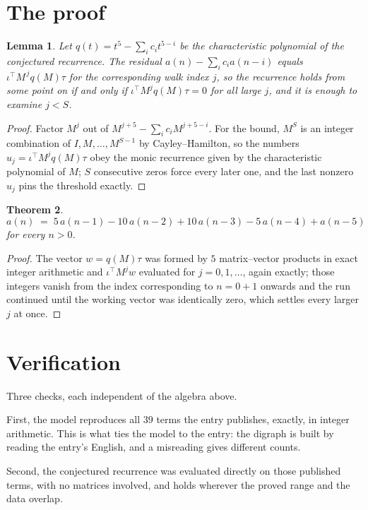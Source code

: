\documentclass[11pt,a4paper]{article}
\theoremstyle{plain}
\newtheorem{theorem}{Theorem}
\newtheorem{lemma}[theorem]{Lemma}
\theoremstyle{definition}
\begin{document}
\section{The proof}

\begin{lemma}\label{lem:crit}
Let $q(t)=t^{5}-\sum_i c_it^{5-i}$ be the characteristic polynomial of the
conjectured recurrence. The residual $a(n)-\sum_ic_ia(n-i)$ equals
$\iota^{\!\top}M^{\,j}q(M)\tau$ for the corresponding walk index $j$, so the recurrence
holds from some point on if and only if $\iota^{\!\top}M^{j}q(M)\tau=0$ for all large $j$,
and it is enough to examine $j<S$.
\end{lemma}

\begin{proof}
Factor $M^{j}$ out of $M^{j+5}-\sum_ic_iM^{j+5-i}$. For the bound, $M^{S}$
is an integer combination of $I,M,\dots,M^{S-1}$ by Cayley--Hamilton, so the numbers
$u_j=\iota^{\!\top}M^{j}q(M)\tau$ obey the monic recurrence given by the characteristic
polynomial of $M$; $S$ consecutive zeros force every later one, and the last nonzero $u_j$
pins the threshold exactly.
\end{proof}

\begin{theorem}
\[
a(n)\;=\;5\,a(n-1) - 10\,a(n-2) + 10\,a(n-3) - 5\,a(n-4) + a(n-5)
\]
for every $n>0$.
\end{theorem}

\begin{proof}
The vector $w=q(M)\tau$ was formed by $5$ matrix--vector products in exact integer
arithmetic and $\iota^{\!\top}M^{j}w$ evaluated for $j=0,1,\dots$, again exactly; those
integers vanish from the index corresponding to $n=0+1$ onwards and the run continued
until the working vector was identically zero, which settles every larger $j$ at once.
\end{proof}

\section{Verification}

Three checks, each independent of the algebra above.

First, the model reproduces all $39$ terms the entry publishes, exactly, in integer
arithmetic. This is what ties the model to the entry: the digraph is built by reading the
entry's English, and a misreading gives different counts.

Second, the conjectured recurrence was evaluated directly on those published terms, with no
matrices involved, and holds wherever the proved range and the data overlap.
\end{document}
